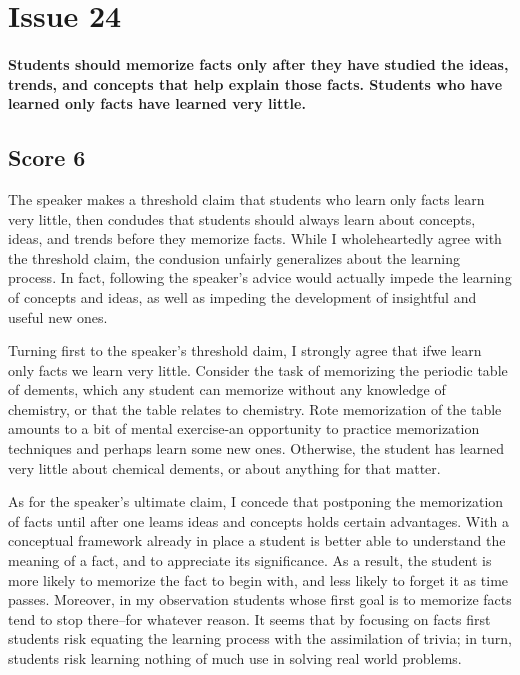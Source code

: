 \section{Issue 24}
\paragraph{
Students should memorize facts only after they have studied the ideas, trends, and concepts that help explain those facts.
Students who have learned only facts have learned very little.
}
\subsection{Score 6}


The speaker makes a threshold claim that students who learn only facts learn very little, then condudes that students should always learn about concepts, ideas, and trends before they memorize facts.
While I wholeheartedly agree with the threshold claim, the condusion unfairly generalizes about the learning process.
In fact, following the speaker's advice would actually impede the learning of concepts and ideas, as well as impeding the development of insightful and useful new ones.


Turning first to the speaker's threshold daim, I strongly agree that ifwe learn only facts we learn very little.
Consider the task of memorizing the periodic table of dements, which any student can memorize without any knowledge of chemistry, or that the table relates to chemistry.
Rote memorization of the table amounts to a bit of mental exercise-an opportunity to practice memorization techniques and perhaps learn some new ones.
Otherwise, the student has learned very little about chemical dements, or about anything for that matter.


As for the speaker's ultimate claim, I concede that postponing the memorization of facts until after one leams ideas and concepts holds certain advantages.
With a conceptual framework already in place a student is better able to understand the meaning of a fact, and to appreciate its significance.
As a result, the student is more likely to memorize the fact to begin with, and less likely to forget it as time passes.
Moreover, in my observation students whose first goal is to memorize facts tend to stop there--for whatever reason.
It seems that by focusing on facts first students risk equating the learning process with the assimilation of trivia; in turn, students risk learning nothing of much use in solving real world problems.


